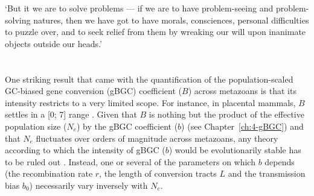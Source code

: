 \begin{savequote}[8cm]
‘But it we are to solve problems — if we are to have problem-seeing and problem-solving natures, then we have got to have morals, consciences, personal difficulties to puzzle over, and to seek relief from them by wreaking our will upon inanimate objects outside our heads.’

\end{savequote}

\chapter*{\label{ch:objectives}}





One striking result that came with the quantification of the population-scaled GC-biased gene conversion (gBGC) coefficient ($B$) across metazoans \citep{galtier2018codon} is that its intensity restricts to a very limited scope.
For instance, in placental mammals, $B$ settles in a [0; 7] range \citep{lartillot2013phylogenetic}.
Given that $B$ is nothing but the product of the effective population size ($N_e$) by the gBGC coefficient ($b$) (see Chapter~\ref{ch:4-gBGC}) and that $N_e$ fluctuates over orders of magnitude across metazoans, any theory according to which the intensity of gBGC ($b$) would be evolutionarily stable has to be ruled out \citep{galtier2018codon}.
Instead, one or several of the parameters on which $b$ depends (the recombination rate $r$, the length of conversion tracts $L$ and the transmission bias $b_0$) necessarily vary inversely with $N_e$.

